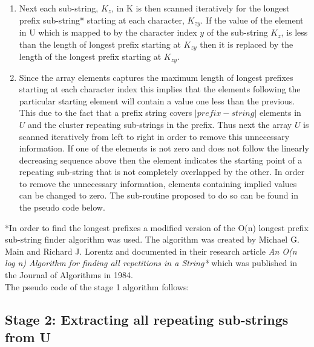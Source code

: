 \documentclass[12pt]{article}
\begin{document}
\begin{flushleft}
\begin{enumerate}
\begin{enumerate}
			\end{enumerate}
		
		\item Next each sub-string, $K_{z}$, in K is then scanned iteratively for the longest prefix sub-string* starting at each character, $K_{zy}$. If the value of the element in U which is mapped to by the character index $y$ of the sub-string $K_{z}$, is less than the length of longest prefix starting at $K_{zy}$ then it is replaced by the length of the longest prefix starting at $K_{zy}$. \\
		
		\item Since the array elements captures the maximum length of longest prefixes starting at each character index this implies that the elements following the particular starting element will contain a value one less than the previous. This due to the fact that a prefix string covers $|prefix-string|$ elements in $U$ and the cluster repeating sub-strings in the prefix. Thus next the array $U$ is scanned iteratively from left to right in order to remove this unnecessary information. If one of the elements is not zero and does not follow the linearly decreasing sequence above then the element indicates the starting point of a repeating sub-string that is not completely overlapped by the other. In order to remove the unnecessary information, elements containing implied values can be changed to zero. The sub-routine proposed to do so can be found in the pseudo code below.   
		
		\end{enumerate}
				  
		*In order to find the longest prefixes a modified version of the O(n) longest prefix sub-string finder algorithm was used. The algorithm was created by Michael G. Main and Richard J. Lorentz and documented in their research article \textit{An O(n log n) Algorithm for finding all repetitions in a String*} which was published in the Journal of Algorithms in 1984.\\
		
		The pseudo code of the stage 1 algorithm follows:
		
	\subsection{Stage 2: Extracting all repeating sub-strings from U}
		

\end{flushleft}
\end{document}
